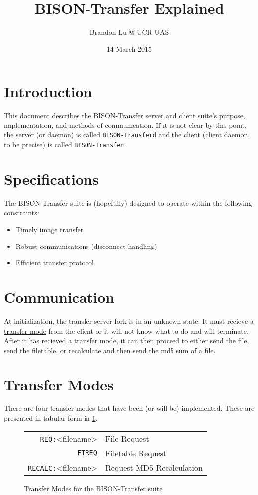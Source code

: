 \documentclass[12pt]{article}
\author{Brandon Lu @ UCR UAS}
\title{BISON-Transfer Explained}
\date{14 March 2015}
\begin{document}
\maketitle
\section{Introduction}
This document describes the BISON-Transfer server and client suite's purpose,
implementation, and methods of communication.
If it is not clear by this point, the server (or daemon)
is called \verb+BISON-Transferd+ and the client (client daemon, to be precise)
is called \verb+BISON-Transfer+.

\section{Specifications}
The BISON-Transfer suite is (hopefully) designed to operate within the
following constraints:
\begin{itemize}
	\item Timely image transfer
	\item Robust communications (disconnect handling)
	\item Efficient transfer protocol
\end{itemize}

\tableofcontents

\section{Communication}
At initialization, the transfer server fork is in an unknown state.  It must
recieve a \hyperref[sec:transfer_modes]{transfer mode} from the client or it
will not know what to
do and will terminate.
After it has recieved a \hyperref[sec:transfer_modes]{transfer mode}, it can
then proceed to either \hyperref[sec:request_file]{send the file},
\hyperref[sec:request_filetable]{send the filetable},
or \hyperref[sec:recalculate_MD5]
{recalculate and then send the md5 sum} of a file. 

\section{Transfer Modes}
\label{sec:transfer_modes}
There are four transfer modes that have been (or will be) implemented.
These are presented in tabular form in \ref{fig:transfer_modes}.
\begin{figure}[H]
	\centering
	\begin{tabular}{r l}
		\verb+REQ:+\textvisiblespace <filename>\carriagereturn\carriagereturn
		& File Request\\
		\verb+FTREQ+\carriagereturn\carriagereturn & Filetable Request \\
		\verb+RECALC:+\textvisiblespace <filename>\carriagereturn
		\carriagereturn & Request MD5 Recalculation
	\end{tabular}
	\caption{Transfer Modes for the BISON-Transfer suite}
	\label{fig:transfer_modes}
\end{figure}
\end{document}
